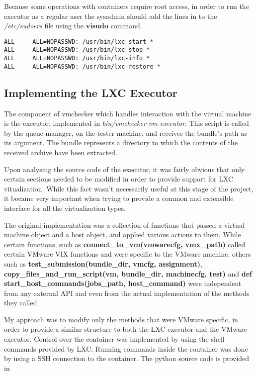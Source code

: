 Because some operations with containers require root access, in order to
run the executor as a regular user the sysadmin should add the lines in 
 to the \textit{/etc/sudoers} file 
using the \textbf{visudo} command.

\lstset{caption=Uninteractive Sudo Permission,label=lst:etc-sudoers}
\begin{lstlisting}
ALL     ALL=NOPASSWD: /usr/bin/lxc-start *
ALL     ALL=NOPASSWD: /usr/bin/lxc-stop *
ALL     ALL=NOPASSWD: /usr/bin/lxc-info *
ALL     ALL=NOPASSWD: /usr/bin/lxc-restore *
\end{lstlisting}


\subsection{Implementing the LXC Executor}
\label{sub-sec:vmc-lxc-executor}

The component of vmchecker which handles interaction with the virtual machine 
is the executor, implemented in \textit{bin/vmchecker-vm-executor}. This script
is called by the queue-manager, on the tester machine, and receives the bundle's
path as its argument. The bundle represents a directory to which the contents
of the received archive have been extracted.

Upon analysing the source code of the executor, it was fairly obvious that
only certain sections needed to be modified in order to provide support for
LXC vitualization. While this fact wasn't necessarily useful at this stage
of the project, it became very important when trying to provide a common and
extensible interface for all the virtualization types.

The original implementation was a collection of functions that passed a 
virtual machine object and a host object, and applied various actions to them.
While certain functions, such as \textbf{connect_to_vm(vmwarecfg, vmx_path)}
called certain VMware VIX functions and were specific to the VMware machine,
others such as \textbf{test_submission(bundle_dir, vmcfg, assignment)}, 
\textbf{copy_files_and_run_script(vm, bundle_dir, machinecfg, test)} and 
\textbf{def start_host_commands(jobs_path, host_command)} were independent
from any external API and even from the actual implementation of the 
methods they called.

My approach was to modify only the methods that were VMware specific, in order
to provide a similar structure to both the LXC executor and the VMware executor.
Control over the container was implemented by using the shell commands
provided by LXC. Running commands inside the container was done by using a 
SSH connection to the container. The python source code is 
provided in 


